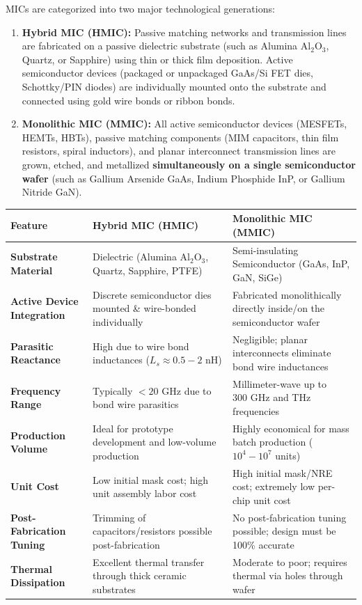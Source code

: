 \documentclass[10pt,a4paper]{article}
\begin{document}
MICs are categorized into two major technological generations:

\begin{enumerate}[leftmargin=*, itemsep=5pt]
  \item \textbf{Hybrid MIC (HMIC):} Passive matching networks and transmission lines are fabricated on a passive dielectric substrate (such as Alumina $\text{Al}_2\text{O}_3$, Quartz, or Sapphire) using thin or thick film deposition. Active semiconductor devices (packaged or unpackaged GaAs/Si FET dies, Schottky/PIN diodes) are individually mounted onto the substrate and connected using gold wire bonds or ribbon bonds.
  \item \textbf{Monolithic MIC (MMIC):} All active semiconductor devices (MESFETs, HEMTs, HBTs), passive matching components (MIM capacitors, thin film resistors, spiral inductors), and planar interconnect transmission lines are grown, etched, and metallized \textbf{simultaneously on a single semiconductor wafer} (such as Gallium Arsenide GaAs, Indium Phosphide InP, or Gallium Nitride GaN).
\end{enumerate}

\par\vspace{6pt}\noindent
\begingroup
\renewcommand{\arraystretch}{1.4}%
\begin{tabularx}{\linewidth}{|>{\raggedright\arraybackslash\bfseries}p{3.2cm}|Y|Y|}
\hline
\textbf{Feature} & \textbf{Hybrid MIC (HMIC)} & \textbf{Monolithic MIC (MMIC)} \\
\hline
Substrate Material & Dielectric (Alumina $\text{Al}_2\text{O}_3$, Quartz, Sapphire, PTFE) & Semi-insulating Semiconductor (GaAs, InP, GaN, SiGe) \\
\hline
Active Device Integration & Discrete semiconductor dies mounted \& wire-bonded individually & Fabricated monolithically directly inside/on the semiconductor wafer \\
\hline
Parasitic Reactance & High due to wire bond inductances ($L_s \approx 0.5 - 2\text{ nH}$) & Negligible; planar interconnects eliminate bond wire inductances \\
\hline
Frequency Range & Typically $< 20\text{ GHz}$ due to bond wire parasitics & Millimeter-wave up to $300\text{ GHz}$ and THz frequencies \\
\hline
Production Volume & Ideal for prototype development and low-volume production & Highly economical for mass batch production ($10^4 - 10^7$ units) \\
\hline
Unit Cost & Low initial mask cost; high unit assembly labor cost & High initial mask/NRE cost; extremely low per-chip unit cost \\
\hline
Post-Fabrication Tuning & Trimming of capacitors/resistors possible post-fabrication & No post-fabrication tuning possible; design must be 100\% accurate \\
\hline
Thermal Dissipation & Excellent thermal transfer through thick ceramic substrates & Moderate to poor; requires thermal via holes through wafer \\
\hline
\end{tabularx}
\endgroup
\end{document}
